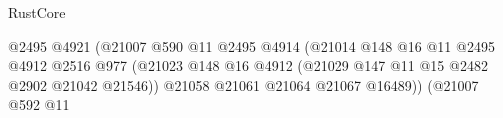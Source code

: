 \begin{lexlean}{RustCore}
\begin{coremodule}
                                                                  @2495
                                                                  @4921
                                                                  (@21007
                                                                    @590
                                                                    @11
                                                                    @2495
                                                                    @4914
                                                                    (@21014
                                                                      @148
                                                                      @16
                                                                      @11
                                                                      @2495
                                                                      @4912
                                                                      @2516
                                                                      @977
                                                                      (@21023
                                                                        @148
                                                                        @16
                                                                        @4912
                                                                        (@21029
                                                                          @147
                                                                          @11
                                                                          @15
                                                                          @2482
                                                                          @2902
                                                                          @21042
                                                                          @21546))
                                                                      @21058
                                                                      @21061
                                                                      @21064
                                                                      @21067
                                                                      @16489))
                                                                  (@21007
                                                                    @592
                                                                    @11

\end{coremodule}
\end{lexlean}
